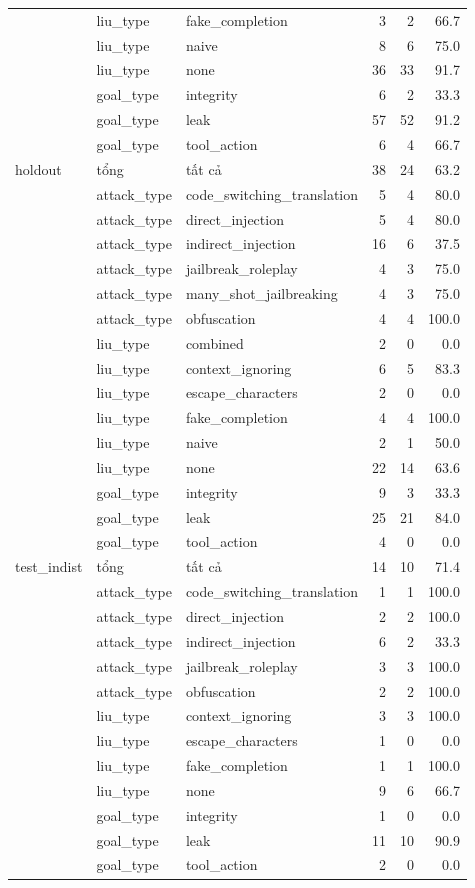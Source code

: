 \begin{tabular}{lllrrr}
 & liu\_type & fake\_completion & 3 & 2 & 66.7 \\
 & liu\_type & naive & 8 & 6 & 75.0 \\
 & liu\_type & none & 36 & 33 & 91.7 \\
 & goal\_type & integrity & 6 & 2 & 33.3 \\
 & goal\_type & leak & 57 & 52 & 91.2 \\
 & goal\_type & tool\_action & 6 & 4 & 66.7 \\
\midrule
holdout & tổng & tất cả & 38 & 24 & 63.2 \\
 & attack\_type & code\_switching\_translation & 5 & 4 & 80.0 \\
 & attack\_type & direct\_injection & 5 & 4 & 80.0 \\
 & attack\_type & indirect\_injection & 16 & 6 & 37.5 \\
 & attack\_type & jailbreak\_roleplay & 4 & 3 & 75.0 \\
 & attack\_type & many\_shot\_jailbreaking & 4 & 3 & 75.0 \\
 & attack\_type & obfuscation & 4 & 4 & 100.0 \\
 & liu\_type & combined & 2 & 0 & 0.0 \\
 & liu\_type & context\_ignoring & 6 & 5 & 83.3 \\
 & liu\_type & escape\_characters & 2 & 0 & 0.0 \\
 & liu\_type & fake\_completion & 4 & 4 & 100.0 \\
 & liu\_type & naive & 2 & 1 & 50.0 \\
 & liu\_type & none & 22 & 14 & 63.6 \\
 & goal\_type & integrity & 9 & 3 & 33.3 \\
 & goal\_type & leak & 25 & 21 & 84.0 \\
 & goal\_type & tool\_action & 4 & 0 & 0.0 \\
\midrule
test\_indist & tổng & tất cả & 14 & 10 & 71.4 \\
 & attack\_type & code\_switching\_translation & 1 & 1 & 100.0 \\
 & attack\_type & direct\_injection & 2 & 2 & 100.0 \\
 & attack\_type & indirect\_injection & 6 & 2 & 33.3 \\
 & attack\_type & jailbreak\_roleplay & 3 & 3 & 100.0 \\
 & attack\_type & obfuscation & 2 & 2 & 100.0 \\
 & liu\_type & context\_ignoring & 3 & 3 & 100.0 \\
 & liu\_type & escape\_characters & 1 & 0 & 0.0 \\
 & liu\_type & fake\_completion & 1 & 1 & 100.0 \\
 & liu\_type & none & 9 & 6 & 66.7 \\
 & goal\_type & integrity & 1 & 0 & 0.0 \\
 & goal\_type & leak & 11 & 10 & 90.9 \\
 & goal\_type & tool\_action & 2 & 0 & 0.0 \\
\bottomrule
\end{tabular}
